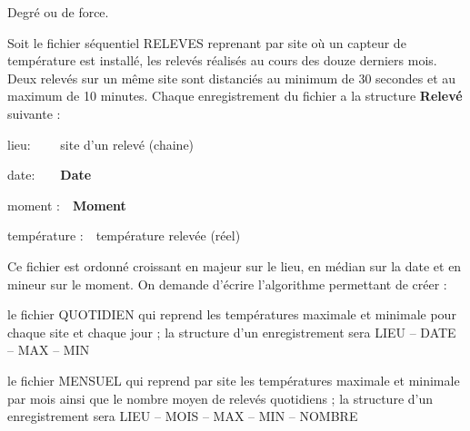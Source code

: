 \begin{Exercice}{Degré ou de force.}

	Soit le fichier séquentiel RELEVES reprenant par site où un capteur de
	température est installé, les relevés réalisés au cours des douze
	derniers mois. Deux relevés sur un même site sont distanciés au minimum
	de 30 secondes et au maximum de 10 minutes. Chaque enregistrement du
	fichier a la structure \textbf{Relevé} suivante :

	{	lieu: \ \ \ \ site d’un relevé (chaine)}

	{	date:\ \ \ \ \textbf{Date}}

	{	moment :\ \ \textbf{Moment}}

	{	température :\ \ température relevée (réel)}

	
	Ce fichier est ordonné croissant en majeur sur le lieu, en médian sur la
	date et en mineur sur le moment. On demande d’écrire l’algorithme
	permettant de créer :

	\begin{liste}
		\item 
			le fichier QUOTIDIEN qui reprend les températures maximale et minimale
			pour chaque site et chaque jour ; la structure d’un enregistrement sera
			LIEU – DATE – MAX – MIN
		\item 
			le fichier MENSUEL qui reprend par site les températures maximale et
			minimale par mois ainsi que le nombre moyen de relevés quotidiens ; la
			structure d’un enregistrement sera LIEU – MOIS – MAX – MIN – NOMBRE
	\end{liste}
\end{Exercice}

